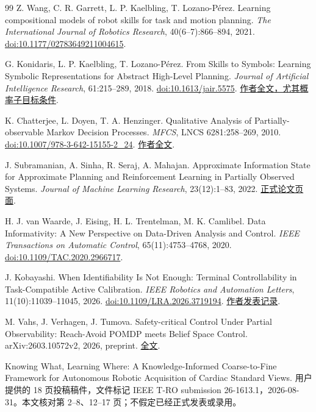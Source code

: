 \documentclass[11pt,a4paper,fontset=fandol]{ctexart}
\theoremstyle{definition}
\theoremstyle{remark}\newtheorem{remark}[theorem]{说明}
\numberwithin{equation}{section}
\begin{document}
\begin{thebibliography}{99}
Z. Wang, C. R. Garrett, L. P. Kaelbling, T. Lozano-Pérez.
Learning compositional models of robot skills for task and motion planning.
\emph{The International Journal of Robotics Research}, 40(6--7):866--894, 2021.
\href{https://doi.org/10.1177/02783649211004615}{doi:10.1177/02783649211004615}.

G. Konidaris, L. P. Kaelbling, T. Lozano-Pérez.
From Skills to Symbols: Learning Symbolic Representations for Abstract High-Level Planning.
\emph{Journal of Artificial Intelligence Research}, 61:215--289, 2018.
\href{https://doi.org/10.1613/jair.5575}{doi:10.1613/jair.5575}.
\href{https://cs.brown.edu/people/gdk/pubs/orig_sym_jair.pdf}{作者全文，尤其概率子目标条件}.

K. Chatterjee, L. Doyen, T. A. Henzinger.
Qualitative Analysis of Partially-observable Markov Decision Processes.
\emph{MFCS}, LNCS 6281:258--269, 2010.
\href{https://doi.org/10.1007/978-3-642-15155-2_24}{doi:10.1007/978-3-642-15155-2\_24}.
\href{https://lsv.ens-paris-saclay.fr/Publis/PAPERS/PDF/CDH-mfcs10.pdf}{作者全文}.

J. Subramanian, A. Sinha, R. Seraj, A. Mahajan.
Approximate Information State for Approximate Planning and Reinforcement Learning in Partially Observed Systems.
\emph{Journal of Machine Learning Research}, 23(12):1--83, 2022.
\href{https://jmlr.org/papers/v23/20-1165.html}{正式论文页面}.

H. J. van Waarde, J. Eising, H. L. Trentelman, M. K. Camlibel.
Data Informativity: A New Perspective on Data-Driven Analysis and Control.
\emph{IEEE Transactions on Automatic Control}, 65(11):4753--4768, 2020.
\href{https://doi.org/10.1109/TAC.2020.2966717}{doi:10.1109/TAC.2020.2966717}.

J. Kobayashi.
When Identifiability Is Not Enough: Terminal Controllability in Task-Compatible Active Calibration.
\emph{IEEE Robotics and Automation Letters}, 11(10):11039--11045, 2026.
\href{https://doi.org/10.1109/LRA.2026.3719194}{doi:10.1109/LRA.2026.3719194}.
\href{https://jkoba0512.github.io/jkoba-lab/publications/}{作者发表记录}.

M. Vahs, J. Verhagen, J. Tumova.
Safety-critical Control Under Partial Observability: Reach-Avoid POMDP meets Belief Space Control.
arXiv:2603.10572v2, 2026, preprint.
\href{https://arxiv.org/html/2603.10572v2}{全文}.

Knowing What, Learning Where: A Knowledge-Informed Coarse-to-Fine Framework for Autonomous Robotic Acquisition of Cardiac Standard Views.
用户提供的 18 页投稿稿件，文件标记 IEEE T-RO submission 26-1613.1，2026-08-31。本文核对第 2--8、12--17 页；不假定已经正式发表或录用。


\end{thebibliography}
\end{document}
